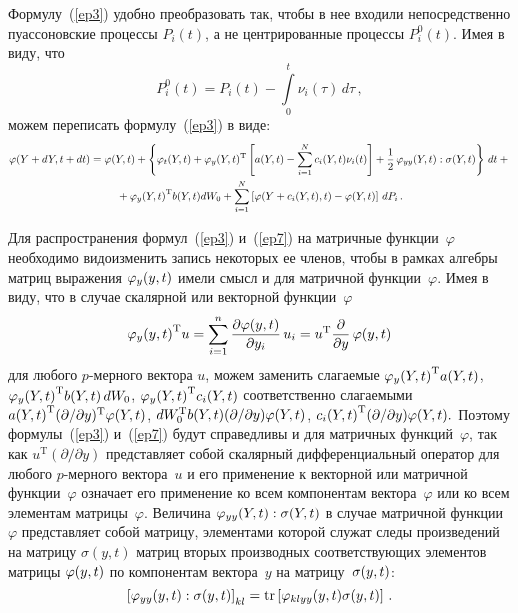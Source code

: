 {Формулу~(\ref{ep3}) удобно преобразовать так, чтобы в нее входили
непосредственно пуассоновские процессы $P_i(t)$, а не центрированные
процессы $P_i^0(t)$. Имея в виду, что
\begin{equation}
P_i^0(t)=P_i(t)-\int\limits_0^t\nu_i(\tau)\,d\tau\,,\label{ep6}
\end{equation}
можем переписать формулу~(\ref{ep3}) в виде:
\begin{multline}
\varphi(Y+dY, t+dt)=\varphi(Y,t)+\left\{\varphi_t(Y,t)+\varphi_y(Y,t)^{\mathrm{T}}
    \left[a(Y,t)-
    \sum_{i=1}^N c_i(Y,t)\nu_i(t)\right]+\displaystyle\frac{\displaystyle 1\mathstrut}{\displaystyle 2\mathstrut}\,\varphi_{yy}(Y,t):\sigma(Y,t)\right\}\,dt
    +{}\\
    {}+\varphi_y{(Y,t)}^{\mathrm{T}}  b(Y,t) dW_0+\sum_{i=1}^N \left[\varphi(Y+c_i(Y,t),t)-
    \varphi(Y,t)\right]\,dP_i\,.\label{ep7}
    \end{multline}

Для распространения формул~(\ref{ep3}) и~(\ref{ep7}) на матричные функции~$\varphi$ необходимо видоизменить запись некоторых ее членов, чтобы
в рамках алгебры матриц выражения $\varphi_y(y,t)$ имели смысл и для
матричной функции~$\varphi$. Имея в виду, что в случае скалярной или
векторной функции~$\varphi$
    $$
    \varphi_y{(y,t)}^{\mathrm{T}}u=\sum\limits_{i=1}^n \displaystyle\frac{\displaystyle \partial\varphi(y,t)\mathstrut}{\displaystyle \partial y_i\mathstrut}\,u_i=u^{\mathrm{T}}\displaystyle\frac{\displaystyle \partial\mathstrut}{\displaystyle \partial y\mathstrut}\,\varphi(y,t)
     $$
для любого $p$-мер\-но\-го вектора $u$, можем заменить слагаемые
$\varphi_y{(Y,t)}^{\mathrm{T}} a(Y,t)$, $\varphi_y{(Y,t)}^{\mathrm{T}} b(Y,t)\, dW_0$,
$\varphi_y{(Y,t)}^{\mathrm{T}} c_i(Y,t)$
соответственно слагаемыми
$a{(Y,t)}^{\mathrm{T}} (\partial/\partial y)^{\mathrm{T}}\varphi(Y,t)$,
$dW_0^{\mathrm{T}}b(Y,t)(\partial/\partial y)\varphi(Y,t)$,
$c_i{(Y,t)}^{\mathrm{T}} (\partial/\partial y)\varphi(Y,t).$
Поэтому формулы~(\ref{ep3}) и~(\ref{ep7}) будут справедливы и для
матричных функций~$\varphi$, так как $u^{\mathrm{T}}(\partial/\partial y)$ представляет собой скалярный дифференциальный оператор для любого
$p$-мер\-но\-го вектора~$u$ и его применение к векторной или матричной
функции~$\varphi$ означает его применение ко всем компонентам вектора~$\varphi$ или ко всем элементам матрицы~$\varphi$. Величина
$\varphi_{yy}(Y,t):\sigma(Y,t)$ в случае матричной функции~$\varphi$
представляет собой матрицу, элементами которой служат следы
произведений на матрицу $\sigma(y,t)$ матриц вторых производных соответствующих элементов
матрицы $\varphi(y,t)$ по компонентам вектора~$y$ на матрицу~$\sigma(y,t)$:
    \begin{equation*}
    \left[\varphi_{yy}\xt : \sigma\xt\right]_{kl}=
    \mbox{tr}\left[\varphi_{klyy}\xt\sigma\xt\right]\,. %
    \end{equation*}

}
